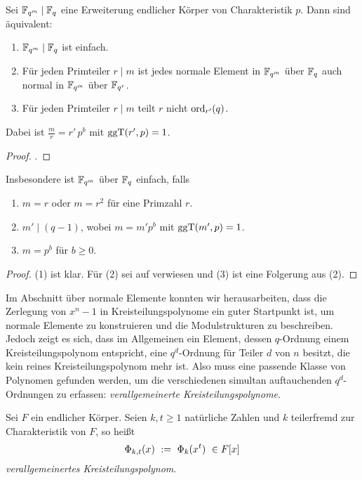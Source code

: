 \begin{satz}
  \label{satz:einfache_erweiterungen}
  Sei $\mathbb{F}_{q^m} \mid \mathbb{F}_q$ eine Erweiterung endlicher Körper
  von Charakteristik $p$. Dann sind äquivalent:
  \begin{enumerate}
    \item $\mathbb{F}_{q^m} \mid \mathbb{F}_q$ ist einfach.
    \item Für jeden Primteiler $r \mid m$ ist jedes normale Element in 
      $\mathbb{F}_{q^m}$ über $\mathbb{F}_q$ auch normal in $\mathbb{F}_{q^m}$ über $\mathbb{F}_{q^r}$.
    \item Für jeden Primteiler $r \mid m$ teilt $r$ nicht
      $\operatorname{ord}_{r'}(q)$.
  \end{enumerate}
  Dabei ist $\tfrac m r = r'\,p^b$ mit $\operatorname{ggT}(r',p) = 1$.
\end{satz}
\begin{proof}
  \autocite[Corollary 15.8]{hachenberger1997finite}.
\end{proof}

\begin{kor}
  \label{kor:einfache_erweiterungen}
  Insbesondere ist $\mathbb{F}_{q^m}$ über $\mathbb{F}_q$ einfach, falls
  \begin{enumerate}
    \item $m = r$ oder $m=r^2$ für eine Primzahl $r$.
    \item $m' \mid (q-1)$, wobei $m=m'p^b$ mit $\operatorname{ggT}(m',p) = 1$.
    \item $m = p^b$ für $b\geq 0$.
  \end{enumerate}
\end{kor}
\begin{proof}
  (1) ist klar. Für (2) sei auf \autocite[Theorem 15.9]{hachenberger1997finite}
  verwiesen und (3) ist eine Folgerung aus (2).
\end{proof}

Im Abschnitt über normale Elemente konnten wir herausarbeiten, dass die
Zerlegung von $x^n-1$ in Kreisteilungspolynome ein guter Startpunkt ist, um
normale Elemente zu konstruieren und die Modulstrukturen zu beschreiben. Jedoch
zeigt es sich, dass im Allgemeinen ein Element, dessen $q$-Ordnung einem
Kreisteilungspolynom entspricht, eine $q^d$-Ordnung für Teiler $d$ von
$n$ besitzt, die kein reines Kreisteilungspolynom mehr ist. 
Also muss eine passende Klasse von Polynomen gefunden werden, um die
verschiedenen simultan auftauchenden $q^d$-Ordnungen zu erfassen: 
\emph{verallgemeinerte Kreisteilungspolynome}.

\begin{definition}
  \label{def:verallgemeinertes_kreisteilungspolynom}
  Sei $F$ ein endlicher Körper. Seien $k,t\geq 1$ natürliche Zahlen und 
  $k$ teilerfremd zur Charakteristik von $F$, so heißt
  \[ \Phi_{k,t}(x) \ :=\  \Phi_k(x^t) \ \in F[x]\]
  \emph{verallgemeinertes Kreisteilungspolynom}.
\end{definition}


